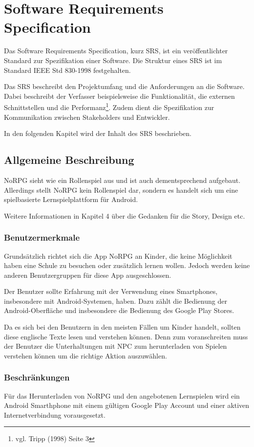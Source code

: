 \chapter{Software Requirements Specification}
	Das Software Requirements Specification, kurz SRS, ist ein veröffentlichter Standard zur Spezifikation einer Software. Die Struktur eines SRS ist im Standard IEEE Std 830-1998 festgehalten.
	
	Das SRS beschreibt den Projektumfang und die Anforderungen an die Software. Dabei beschreibt der Verfasser beispielsweise die Funktionalität, die externen Schnittstellen und die Performanz\footnote{vgl. Tripp \cite{srsIEEE}(1998) Seite 3}. Zudem dient die Spezifikation zur Kommunikation zwischen Stakeholders und Entwickler. 
	
	In den folgenden Kapitel wird der Inhalt des SRS beschrieben.
	
\section{Allgemeine Beschreibung}
	NoRPG sieht wie ein Rollenspiel aus und ist auch dementsprechend aufgebaut. Allerdings stellt NoRPG kein Rollenspiel dar, sondern es handelt sich um eine spielbasierte Lernspielplattform für Android.  	
	
	Weitere Informationen in Kapitel 4 über die Gedanken für die Story, Design etc.
	
	\subsection{Benutzermerkmale}
		Grundsätzlich richtet sich die App NoRPG an Kinder, die keine Möglichkeit haben eine Schule zu besuchen oder zusätzlich lernen wollen. Jedoch werden keine anderen Benutzergruppen für diese App ausgeschlossen.
		
		Der Benutzer sollte Erfahrung mit der Verwendung eines Smartphones, insbesondere mit Android-Systemen, haben. Dazu zählt die Bedienung der Android-Oberfläche und insbesondere die Bedienung des Google Play Stores.
		
		Da es sich bei den Benutzern in den meisten Fällen um Kinder handelt, sollten diese englische Texte lesen und verstehen können. Denn zum voranschreiten muss der Benutzer die Unterhaltungen mit NPC zum herunterladen von Spielen verstehen können um die richtige Aktion auszuwählen.
	
	\subsection{Beschränkungen} 
		Für das Herunterladen von NoRPG und den angebotenen Lernspielen wird ein Android Smarthphone mit einem gültigen Google Play Account und einer aktiven Internetverbindung vorausgesetzt. 
		
